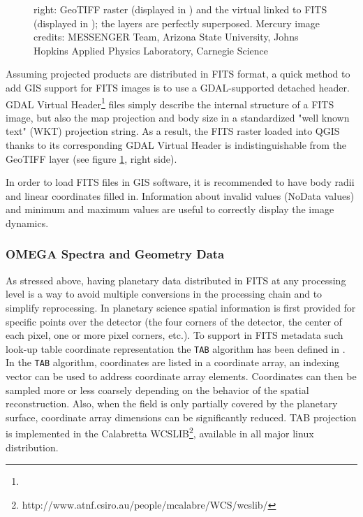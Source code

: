 \begin{figure}[ht!]
{right: GeoTIFF raster (displayed in \DIFdelbeginFL {}\DIFdelendFL \DIFaddbeginFL {}\DIFaddendFL ) and the \DIFaddbeginFL {}\DIFaddendFL virtual \DIFdelbeginFL {}\DIFdelendFL \DIFaddbeginFL {}\DIFaddendFL linked to \DIFdelbeginFL {}\DIFdelendFL FITS \DIFdelbeginFL {}\DIFdelendFL \DIFaddbeginFL {}\DIFaddendFL (displayed in \DIFdelbeginFL {}\DIFdelendFL \DIFaddbeginFL {}\DIFaddendFL ); the \DIFdelbeginFL {}\DIFdelendFL \DIFaddbeginFL {}\DIFaddendFL layers
are perfectly superposed.
Mercury image credits: MESSENGER Team, Arizona State University, Johns Hopkins Applied
Physics Laboratory, Carnegie Science}
\label{fig:ds9qgis}
\end{figure}

Assuming projected products are distributed in FITS format, a quick method to add GIS
support for FITS images is to use a GDAL-supported detached header.
GDAL Virtual Header\DIFaddbegin \footnote{}
\DIFaddend files simply describe the internal structure of a FITS image, but
also the map projection and body size in a standardized "well known text"
(WKT) projection string.
As a result, the FITS raster loaded into QGIS thanks to its corresponding GDAL Virtual
Header is indistinguishable from the GeoTIFF layer (see figure \ref{fig:ds9qgis},
right side).

In order to load FITS files in GIS software, it is recommended to have
body radii and linear coordinates filled in.
Information about invalid values (NoData values) and minimum and maximum values are
useful to correctly display the image dynamics.

\subsubsection{OMEGA Spectra and Geometry Data}
As stressed above, having planetary data distributed in FITS at any processing level is
a way to avoid multiple conversions in the processing chain and to simplify
reprocessing.
In planetary science spatial information is first provided for specific points over
the detector (the four corners of the detector, the center of each pixel,
one or more pixel corners, etc.).
To support in FITS metadata such look-up table coordinate representation the
\texttt{TAB} algorithm has been defined in \citet{wcsspectral}.
In the \texttt{TAB} algorithm, coordinates are listed in a coordinate array,
an indexing vector can be used to address coordinate array elements.
Coordinates can then be sampled more or less coarsely depending on the behavior of the
spatial reconstruction.
Also, when the field is only partially covered by the planetary surface, coordinate
array dimensions can be significantly reduced. 
TAB projection is implemented in the Calabretta WCSLIB\footnote{http://www.atnf.csiro.au/people/mcalabre/WCS/wcslib/},
available in all major linux distribution.


